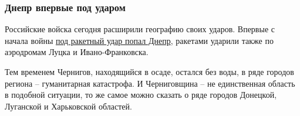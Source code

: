  
 
 
 
 

\subsubsection{Днепр впервые под ударом}
\label{sec:11_03_2022.stz.news.ua.strana.1.kiev_v_osade_itogi.4.dnepr}

Российские войска сегодня расширили географию своих ударов. Впервые с начала
войны \href{https://strana.news/news/381258-udarivshie-po-dnepru-rossijskie-rakety-razrushili-obuvnuju-fabriku-pohib-odin-chelovek.html}{под ракетный удар попал Днепр}, ракетами ударили также по аэродромам Луцка
и Ивано-Франковска.

Тем временем Чернигов, находящийся в осаде, остался без воды, в ряде городов
региона – гуманитарная катастрофа. И Черниговщина – не единственная область в
подобной ситуации, то же самое можно сказать о ряде городов Донецкой, Луганской
и Харьковской областей.
